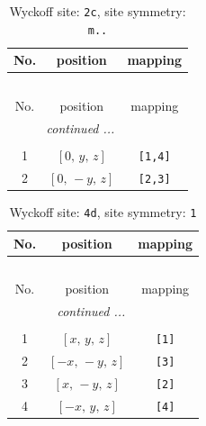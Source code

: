 \documentclass[fleqn,8pt]{jsarticle}
\begin{document}
\begin{longtable}{ccc}
\caption{Wyckoff site: {\tt 2c}, site symmetry: {\tt m..}}
 \\
 \hline \hline
No. & position & mapping \\ \hline \endfirsthead

\multicolumn{2}{l}{\tablename\ \thetable{}} \\
 \hline \hline
No. & position & mapping \\ \hline \endhead

 \hline \hline
\multicolumn{2}{r}{\footnotesize\it continued ...} \\ \endfoot

 \hline \hline
\multicolumn{2}{r}{} \\ \endlastfoot

1 & $\left[ 0,\, y,\, z \right]$ & {\tt [1,4]} \\ \hline
2 & $\left[ 0,\, - y,\, z \right]$ & {\tt [2,3]} \\
\end{longtable}
\renewcommand{\arraystretch}{1.2}
\begin{longtable}{ccc}
\caption{Wyckoff site: {\tt 4d}, site symmetry: {\tt 1}}
 \\
 \hline \hline
No. & position & mapping \\ \hline \endfirsthead

\multicolumn{2}{l}{\tablename\ \thetable{}} \\
 \hline \hline
No. & position & mapping \\ \hline \endhead

 \hline \hline
\multicolumn{2}{r}{\footnotesize\it continued ...} \\ \endfoot

 \hline \hline
\multicolumn{2}{r}{} \\ \endlastfoot

1 & $\left[ x,\, y,\, z \right]$ & {\tt [1]} \\ \hline
2 & $\left[ - x,\, - y,\, z \right]$ & {\tt [3]} \\ \hline
3 & $\left[ x,\, - y,\, z \right]$ & {\tt [2]} \\ \hline
4 & $\left[ - x,\, y,\, z \right]$ & {\tt [4]} \\
\end{longtable}
\end{document}
